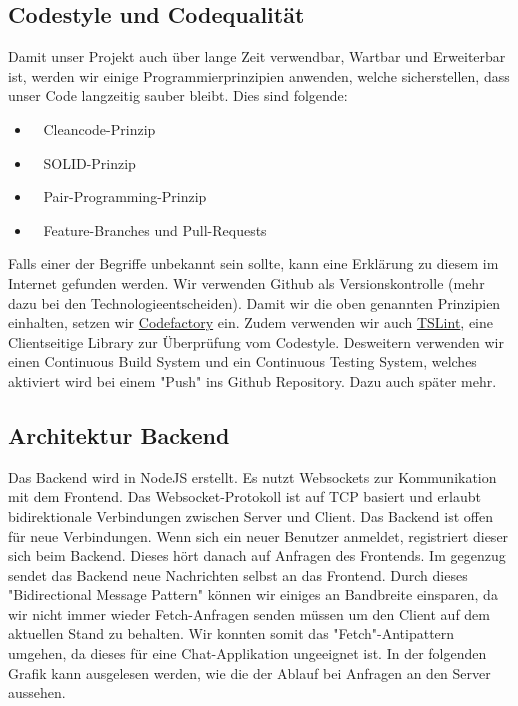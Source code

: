 	\subsection{Codestyle und Codequalität}
	Damit unser Projekt auch über lange Zeit verwendbar, Wartbar und Erweiterbar ist, werden wir einige Programmierprinzipien anwenden, welche sicherstellen, dass unser Code langzeitig sauber bleibt. Dies sind folgende:
	\begin{itemize}
		\item \faCode~ Cleancode-Prinzip
		\item \faInstitution~ SOLID-Prinzip
		\item \faUsers~ Pair-Programming-Prinzip
		\item \faGit~ Feature-Branches und Pull-Requests
	\end{itemize}
	Falls einer der Begriffe unbekannt sein sollte, kann eine Erklärung zu diesem im Internet gefunden werden.\newline
	Wir verwenden Github als Versionskontrolle (mehr dazu bei den Technologieentscheiden). Damit wir die oben genannten Prinzipien einhalten, setzen wir \href{https://www.codefactor.io}{Codefactory} ein. Zudem verwenden wir auch \href{https://palantir.github.io/tslint/}{TSLint}, eine Clientseitige Library zur Überprüfung vom Codestyle.\newline
	Desweitern verwenden wir einen Continuous Build System und ein Continuous Testing System, welches aktiviert wird bei einem "Push" ins Github Repository. Dazu auch später mehr.

	\subsection{Architektur Backend}
	Das Backend wird in NodeJS erstellt. Es nutzt Websockets zur Kommunikation mit dem Frontend. Das Websocket-Protokoll ist auf TCP basiert und erlaubt bidirektionale Verbindungen zwischen Server und Client. Das Backend ist offen für neue Verbindungen. Wenn sich ein neuer Benutzer anmeldet, registriert dieser sich beim Backend. Dieses hört danach auf Anfragen des Frontends. Im gegenzug sendet das Backend neue Nachrichten selbst an das Frontend. Durch dieses "Bidirectional Message Pattern" können wir einiges an Bandbreite einsparen, da wir nicht immer wieder Fetch-Anfragen senden müssen um den Client auf dem aktuellen Stand zu behalten. Wir konnten somit das "Fetch"-Antipattern umgehen, da dieses für eine Chat-Applikation ungeeignet ist. In der folgenden Grafik kann ausgelesen werden, wie die der Ablauf bei Anfragen an den Server aussehen.
